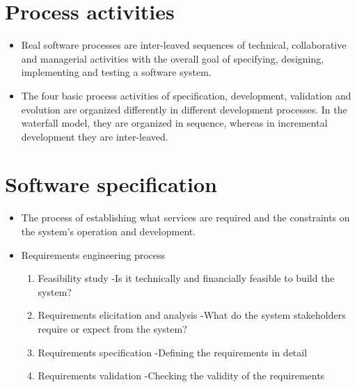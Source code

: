 \section{Process activities}
\begin{itemize}
\item Real software processes are inter-leaved sequences of technical, collaborative and managerial activities with the overall goal of specifying, designing, implementing and testing a software system.

\item The four basic process activities of specification, development, validation and evolution are organized differently in different development processes. In the waterfall model, they are organized in sequence, whereas in incremental development they are inter-leaved.
\end{itemize}

\section{Software specification}
\begin{itemize}

\item The process of establishing what services are required and the constraints on the system’s operation and development.

\item Requirements engineering process
\begin{enumerate}

\item Feasibility study
\newline
-Is it technically and financially feasible to build the system? \newline
\item Requirements elicitation and analysis
-What do the system stakeholders require or expect from the system? \newline
\item Requirements specification
-Defining the requirements in detail \newline
\item Requirements validation
-Checking the validity of the requirements
\end{enumerate}

\end{itemize}

\newpage
